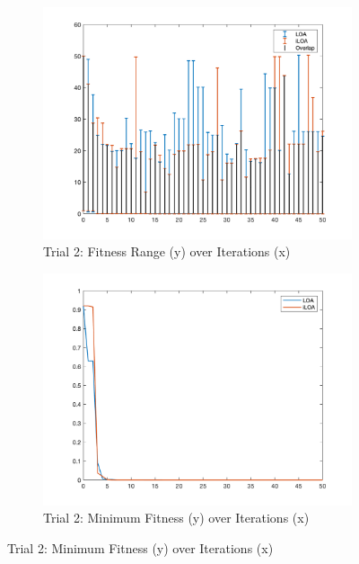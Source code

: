 \begin{figure}
  \begin{subfigure}[b]{0.4\textwidth}
    \includegraphics[width=\textwidth]{img/bars/f3/2}
    \caption{ \scriptsize Trial 2: Fitness Range (y) over Iterations (x)}
    \label{fig:f3-b-2}
  \end{subfigure}
  \begin{subfigure}[b]{0.4\textwidth}
    \includegraphics[width=\textwidth]{img/fits/f3/2}
    \caption{ \scriptsize Trial 2: Minimum Fitness (y) over Iterations (x)}
    \label{fig:f3-f-2}
  \end{subfigure}


\end{figure}
